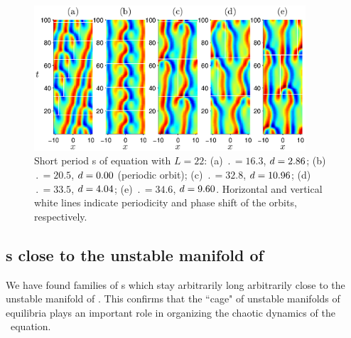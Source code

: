 \begin{figure}[t]
\begin{center}
\includegraphics[width=0.9\textwidth]{figs/ks22rposShort.eps}
\end{center}
\caption{Short period \rpo s of \KS equation with $L = 22$: (a) $\period{} =
16.3$, $d = 2.86$; (b) $\period{} = 20.5$, $d = 0.00$ (periodic
orbit); (c) $\period{} = 32.8$, $d = 10.96$; (d) $\period{} = 33.5$, $d =
4.04$; (e) $\period{} = 34.6$, $d = 9.60$.  Horizontal and vertical
white lines indicate periodicity and phase shift of the orbits,
respectively. }\label{f:ks22rposShort}
\end{figure}


\subsection{\Rpo s close to the unstable manifold of  }

We have found families of \rpo s which stay arbitrarily long 
arbitrarily close to the
unstable manifold of .  This confirms that the ``cage" of
unstable manifolds of equilibria plays an important role in
organizing the chaotic dynamics of the \KS\ equation.

